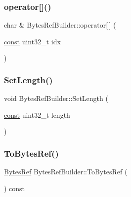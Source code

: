 \subsubsection{\texorpdfstring{operator[]()}{operator[]()}}
{\footnotesize\ttfamily char \& Bytes\+Ref\+Builder\+::operator\mbox{[}$\,$\mbox{]} (\begin{DoxyParamCaption}\item[{\mbox{\hyperlink{ZlibCrc32_8h_a2c212835823e3c54a8ab6d95c652660e}{const}} uint32\+\_\+t}]{idx }\end{DoxyParamCaption})}

\mbox{\label{classlucene_1_1core_1_1util_1_1BytesRefBuilder_a34ba90028288970e12074c73f83fac35}} 
\subsubsection{\texorpdfstring{Set\+Length()}{SetLength()}}
{\footnotesize\ttfamily void Bytes\+Ref\+Builder\+::\+Set\+Length (\begin{DoxyParamCaption}\item[{\mbox{\hyperlink{ZlibCrc32_8h_a2c212835823e3c54a8ab6d95c652660e}{const}} uint32\+\_\+t}]{length }\end{DoxyParamCaption})}

\mbox{\label{classlucene_1_1core_1_1util_1_1BytesRefBuilder_ae481f6bccf50d56bf37a5a726c89f6ca}} 
\subsubsection{\texorpdfstring{To\+Bytes\+Ref()}{ToBytesRef()}}
{\footnotesize\ttfamily \mbox{\hyperlink{classlucene_1_1core_1_1util_1_1BytesRef}{Bytes\+Ref}} Bytes\+Ref\+Builder\+::\+To\+Bytes\+Ref (\begin{DoxyParamCaption}{ }\end{DoxyParamCaption}) const}



